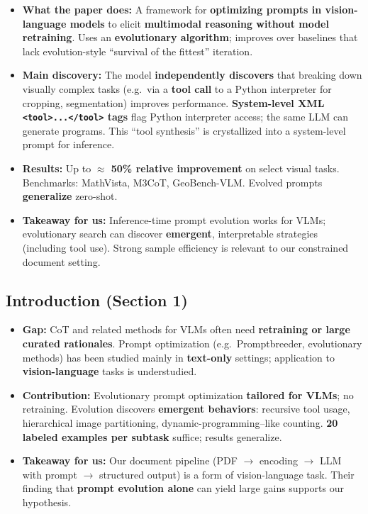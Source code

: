 \documentclass[11pt,a4paper]{article}
\begin{document}
\begin{itemize}
  \item \textbf{What the paper does:} A framework for \textbf{optimizing prompts in vision-language models} to elicit \textbf{multimodal reasoning without model retraining}. Uses an \textbf{evolutionary algorithm}; improves over baselines that lack evolution-style ``survival of the fittest'' iteration.
  \item \textbf{Main discovery:} The model \textbf{independently discovers} that breaking down visually complex tasks (e.g.\ via a \textbf{tool call} to a Python interpreter for cropping, segmentation) improves performance. \textbf{System-level XML \texttt{<tool>...</tool>} tags} flag Python interpreter access; the same LLM can generate programs. This ``tool synthesis'' is crystallized into a system-level prompt for inference.
  \item \textbf{Results:} Up to \textbf{$\approx$ 50\% relative improvement} on select visual tasks. Benchmarks: MathVista, M3CoT, GeoBench-VLM. Evolved prompts \textbf{generalize} zero-shot.
  \item \textbf{Takeaway for us:} Inference-time prompt evolution works for VLMs; evolutionary search can discover \textbf{emergent}, interpretable strategies (including tool use). Strong sample efficiency is relevant to our constrained document setting.
\end{itemize}

\subsection{Introduction (Section 1)}

\begin{itemize}
  \item \textbf{Gap:} CoT and related methods for VLMs often need \textbf{retraining or large curated rationales}. Prompt optimization (e.g.\ Promptbreeder, evolutionary methods) has been studied mainly in \textbf{text-only} settings; application to \textbf{vision-language} tasks is understudied.
  \item \textbf{Contribution:} Evolutionary prompt optimization \textbf{tailored for VLMs}; no retraining. Evolution discovers \textbf{emergent behaviors}: recursive tool usage, hierarchical image partitioning, dynamic-programming--like counting. \textbf{20 labeled examples per subtask} suffice; results generalize.
  \item \textbf{Takeaway for us:} Our document pipeline (PDF $\to$ encoding $\to$ LLM with prompt $\to$ structured output) is a form of vision-language task. Their finding that \textbf{prompt evolution alone} can yield large gains supports our hypothesis.
\end{itemize}
\end{document}
